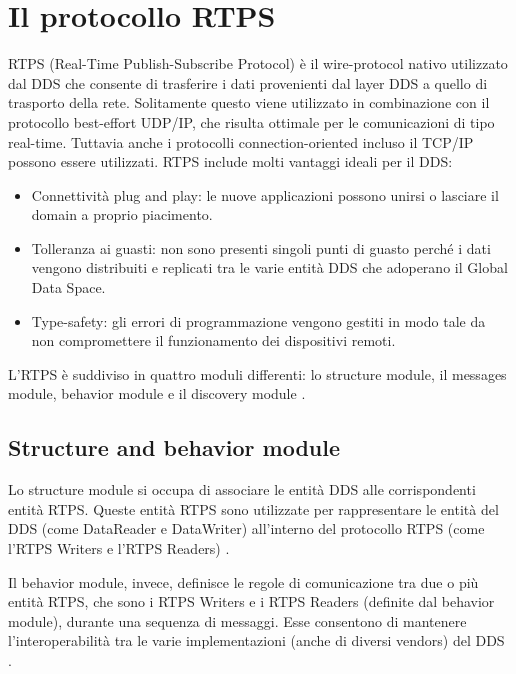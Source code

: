 \section{Il protocollo RTPS}
RTPS (Real-Time Publish-Subscribe Protocol) è il wire-protocol 
nativo utilizzato dal DDS che consente di trasferire i dati provenienti
dal layer DDS a quello di trasporto della rete.
Solitamente questo viene utilizzato in combinazione con il protocollo
best-effort
UDP/IP, che risulta ottimale per le comunicazioni di tipo real-time. Tuttavia 
anche i protocolli connection-oriented incluso il TCP/IP possono essere utilizzati. 
RTPS include molti vantaggi ideali per il DDS:
\begin{itemize}
    \item Connettività plug and play: le nuove applicazioni possono unirsi o 
    lasciare il domain a proprio piacimento.
    \item Tolleranza ai guasti: non sono presenti singoli punti di 
    guasto perché i dati vengono distribuiti e replicati tra le varie 
    entità DDS che adoperano il Global Data Space.
    \item Type-safety: gli errori di programmazione vengono gestiti 
    in modo tale da non compromettere il funzionamento 
    dei dispositivi remoti.
\end{itemize}
L'RTPS è suddiviso in quattro moduli differenti: lo structure module, il 
messages module, behavior module e il discovery module \cite{ddsrtps}.

\subsection{Structure and behavior module}
Lo structure module si occupa di associare le entità DDS alle corrispondenti
entità RTPS. Queste entità RTPS sono utilizzate 
per rappresentare le entità del DDS (come DataReader e DataWriter) 
all'interno del protocollo RTPS (come l'RTPS Writers e l'RTPS Readers) 
\cite{ddsrtps}.

Il behavior module, invece, definisce le regole di comunicazione tra
due o più entità RTPS, che sono i RTPS Writers e i RTPS Readers 
(definite dal behavior module), durante 
una sequenza di messaggi.
Esse consentono di mantenere l'interoperabilità tra le varie 
implementazioni (anche di diversi vendors) del DDS \cite{ddsrtps}.


